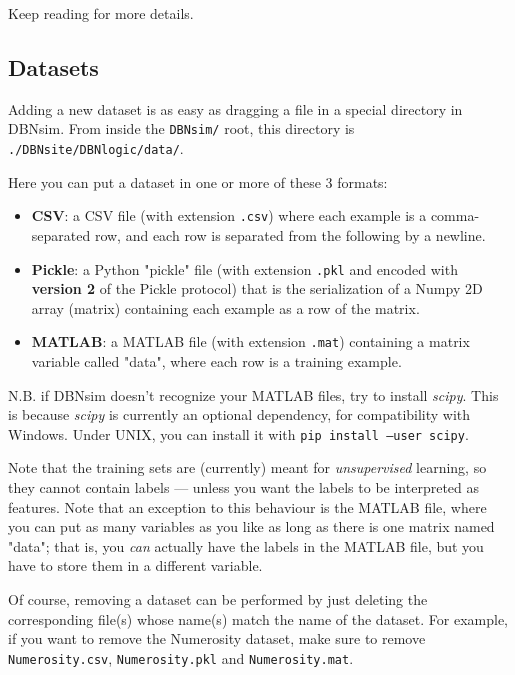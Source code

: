 \documentclass[a4paper]{article}
\begin{document}
		
Keep reading for more details.

		
	\subsection{Datasets}

		
Adding a new dataset is as easy as dragging a file in a special directory in DBNsim. From inside the \texttt{DBNsim/} root, this directory is \texttt{./DBNsite/DBNlogic/data/}.
		
Here you can put a dataset in one or more of these 3 formats:
		
	\begin{itemize}
		
			
	\item \textbf{CSV}: a CSV file (with extension \texttt{.csv}) where each example is a comma-separated row, and each row is separated from the following by a newline.
			
	\item \textbf{Pickle}: a Python "pickle" file (with extension \texttt{.pkl} and encoded with \textbf{version 2} of the Pickle protocol) that is the serialization of a Numpy 2D array (matrix) containing each example as a row of the matrix.
			
	\item \textbf{MATLAB}: a MATLAB file (with extension \texttt{.mat}) containing a matrix variable called "data", where each row is a training example.
		
	\end{itemize}

		
N.B. if DBNsim doesn't recognize your MATLAB files, try to install \emph{scipy}. This is because \emph{scipy} is currently an optional dependency, for compatibility with Windows. Under UNIX, you can install it with \texttt{pip install --user scipy}.
		
Note that the training sets are (currently) meant for \emph{unsupervised} learning, so they cannot contain labels --- unless you want the labels to be interpreted as features. Note that an exception to this behaviour is the MATLAB file, where you can put as many variables as you like as long as there is one matrix named "data"; that is, you \emph{can} actually have the labels in the MATLAB file, but you have to store them in a different variable.
		
Of course, removing a dataset can be performed by just deleting the corresponding file(s) whose name(s) match the name of the dataset. For example, if you want to remove the Numerosity dataset, make sure to remove \texttt{Numerosity.csv}, \texttt{Numerosity.pkl} and \texttt{Numerosity.mat}.
		
\end{document}
